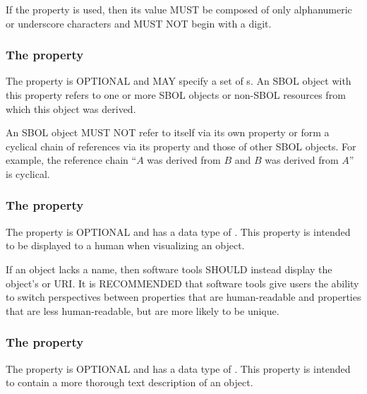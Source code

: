 If the  property is used, then its  value MUST be composed of only alphanumeric or underscore characters and MUST NOT begin with a digit.


\subsubsection*{The  property}
\label{sec:wasDerivedFroms}


The  property is OPTIONAL and MAY specify a set of s. An SBOL object with this property refers to one or more SBOL objects or non-SBOL resources from which this object was derived.

An SBOL object MUST NOT refer to itself via its own  property or form a cyclical chain of references via its  property and those of other SBOL objects. For example, the reference chain ``$A$ was derived from $B$ and $B$ was derived from $A$'' is cyclical.


\subsubsection*{The  property}
\label{sec:name}

The  property is OPTIONAL and has a data type of . This property is intended to be displayed to a human when visualizing an  object.

If an  object lacks a name, then software tools SHOULD instead display the object's  or URI.
It is RECOMMENDED that software tools give users the ability to switch perspectives between  properties that are human-readable and  properties that are less human-readable, but are more likely to be unique.

\subsubsection*{The  property}
\label{sec:description}

The  property is OPTIONAL and has a data type of . This property is intended to contain a more thorough text description of an  object.

